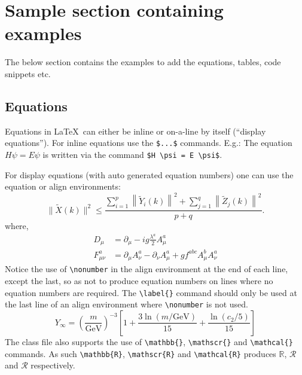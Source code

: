 \documentclass[ml4h-mathphys]{ml4h-jnl}%
\theoremstyle{thmstyleone}%
\theoremstyle{thmstyletwo}%
\theoremstyle{thmstylethree}%
\begin{document}




\pagebreak
\section*{Sample section containing examples}
The below section contains the examples to add the equations, tables, code snippets etc.

\subsection{Equations}\label{sec4}

Equations in \LaTeX\ can either be inline or on-a-line by itself (``display equations''). For
inline equations use the \verb+$...$+ commands. E.g.: The equation
$H\psi = E \psi$ is written via the command \verb+$H \psi = E \psi$+.

For display equations (with auto generated equation numbers)
one can use the equation or align environments:
\begin{equation}
\|\tilde{X}(k)\|^2 \leq\frac{\sum\limits_{i=1}^{p}\left\|\tilde{Y}_i(k)\right\|^2+\sum\limits_{j=1}^{q}\left\|\tilde{Z}_j(k)\right\|^2 }{p+q}.\label{eq1}
\end{equation}
where,
\begin{align}
D_\mu &=  \partial_\mu - ig \frac{\lambda^a}{2} A^a_\mu \nonumber \\
F^a_{\mu\nu} &= \partial_\mu A^a_\nu - \partial_\nu A^a_\mu + g f^{abc} A^b_\mu A^a_\nu \label{eq2}
\end{align}
Notice the use of \verb+\nonumber+ in the align environment at the end
of each line, except the last, so as not to produce equation numbers on
lines where no equation numbers are required. The \verb+\label{}+ command
should only be used at the last line of an align environment where
\verb+\nonumber+ is not used.
\begin{equation}
Y_\infty = \left( \frac{m}{\textrm{GeV}} \right)^{-3}
    \left[ 1 + \frac{3 \ln(m/\textrm{GeV})}{15}
    + \frac{\ln(c_2/5)}{15} \right]
\end{equation}
The class file also supports the use of \verb+\mathbb{}+, \verb+\mathscr{}+ and
\verb+\mathcal{}+ commands. As such \verb+\mathbb{R}+, \verb+\mathscr{R}+
and \verb+\mathcal{R}+ produces $\mathbb{R}$, $\mathscr{R}$ and $\mathcal{R}$ respectively.
\end{document}
